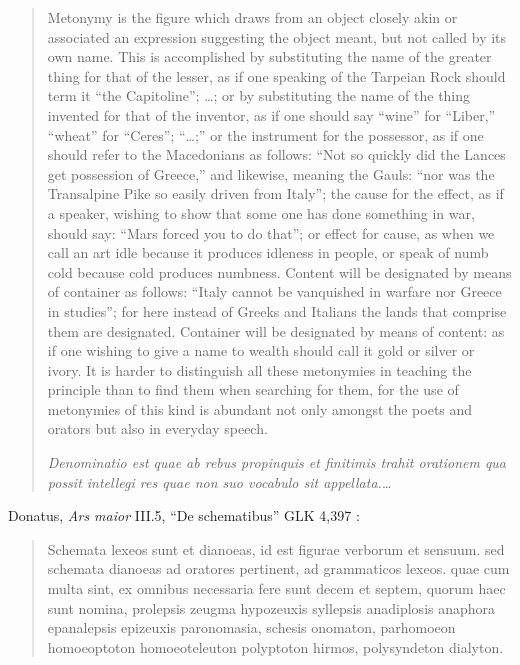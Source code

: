 \documentclass{article}
\begin{document}
\begin{quote}
Metonymy is the figure which draws from an object closely akin or associated an expression suggesting the object meant, but not called by its own name. This is accomplished by substituting the name of the greater thing for that of the lesser, as if one speaking of the Tarpeian Rock should term it ``the Capitoline''; \dots; or by substituting the name of the thing invented for that of the inventor, as if one should say ``wine'' for ``Liber,'' ``wheat'' for ``Ceres''; ``\dots;'' or the instrument for the possessor, as if one should refer to the Macedonians
as follows: ``Not so quickly did the Lances get possession of Greece,'' and likewise, meaning the Gauls: ``nor was the Transalpine Pike so easily driven from Italy''; the cause for the effect, as if a speaker, wishing to show that some one has done something in war, should say: ``Mars forced you to do that''; or effect for cause, as when we call an art idle because it produces idleness in people, or speak of numb cold because cold produces numbness. Content will be designated by means of container as follows: ``Italy cannot be vanquished in warfare nor Greece in studies''; for here instead of Greeks and Italians the lands that comprise them are designated. Container will be designated by means of content: as if one wishing to give a name to wealth should call it gold or silver or ivory. It is harder to distinguish all these metonymies in teaching the principle than to find them when searching for them, for the use of metonymies of this kind is abundant not only amongst the poets and orators but also in everyday speech.

{\em Denominatio est quae ab rebus propinquis
et finitimis trahit orationem qua possit intellegi res quae non suo vocabulo sit appellata.}\dots
\end{quote}

Donatus, {\em Ars maior} III.5, ``De schematibus'' GLK 4,397 \cite{GLK}:

\begin{quote}
Schemata lexeos sunt et dianoeas, id est figurae verborum et sensuum.
sed schemata dianoeas ad oratores pertinent, ad grammaticos lexeos.
quae cum multa sint, ex omnibus necessaria fere sunt decem et septem, quorum haec sunt nomina,
 prolepsis zeugma hypozeuxis syllepsis anadiplosis anaphora epanalepsis epizeuxis paronomasia, schesis onomaton, parhomoeon homoeoptoton homoeoteleuton polyptoton hirmos, polysyndeton dialyton.
\end{quote}
\end{document}
